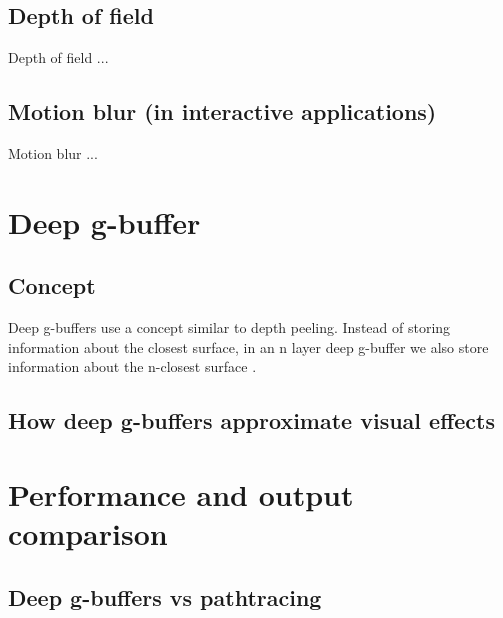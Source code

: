 \documentclass{ACGSeminar}
\begin{document}
	\subsection{Depth of field}
		Depth of field ...

	\subsection{Motion blur (in interactive applications)}
		Motion blur ...

\section{Deep g-buffer}
	\subsection{Concept}
		Deep g-buffers use a concept similar to depth peeling. Instead of storing information about the closest surface, in an n layer deep g-buffer we also store information about the n-closest surface \cite{NDGB}.
	\subsection{How deep g-buffers approximate visual effects}


\section{Performance and output comparison}
	\subsection{Deep g-buffers vs pathtracing}

\printbibliography
\end{document}
